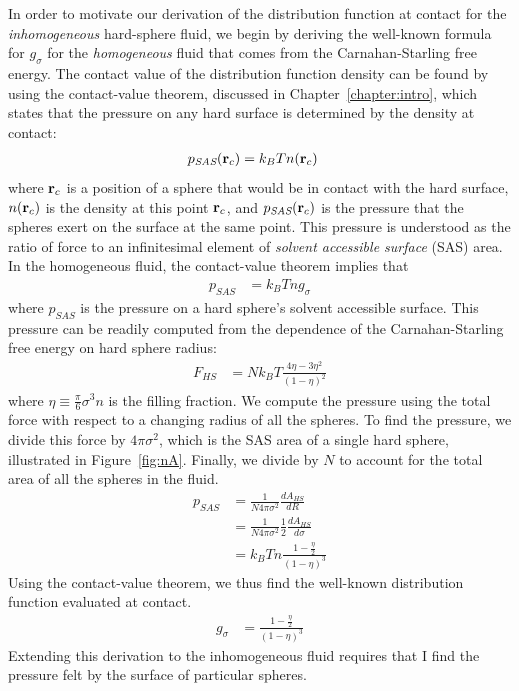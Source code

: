 In order to motivate our derivation of the distribution function at
contact for the \emph{inhomogeneous} hard-sphere fluid, we begin by
deriving the well-known formula for $g_\sigma$ for the
\emph{homogeneous} fluid that comes from the Carnahan-Starling free
energy.  The contact value of the distribution function density can be
found by using the contact-value theorem, discussed in
Chapter~\ref{chapter:intro}, which states that the pressure on any
hard surface is determined by the density at contact:
\begin{align}
  p_{\textit{SAS}}(\textbf{r}_c) &= k_BT n(\textbf{r}_c)
\end{align}
where $\textbf{r}_c$ is a position of a sphere that would be in contact with
the hard surface, $n(\textbf{r}_c)$ is the density at this point $\textbf{r}_c$, and
$p_{\textit{SAS}}(\textbf{r}_c)$ is the pressure that the spheres
exert on the surface at the same point.  This pressure is
understood as the ratio of force to an infinitesimal element of
\emph{solvent accessible surface} (SAS) area.
%
In the homogeneous fluid, the contact-value theorem implies that
\begin{align}
  p_{\textit{SAS}} &= k_BT n g_\sigma
\end{align}
where $p_{SAS}$ is the pressure on a hard sphere's solvent accessible surface.
This pressure can be
readily computed from the dependence of the Carnahan-Starling free
energy on hard sphere radius:
\begin{align}
  F_{HS} &= Nk_BT \frac{4\eta - 3\eta^2}{(1-\eta)^2}
\end{align}
where $\eta \equiv \frac{\pi}{6} \sigma^3 n$ is the filling fraction.
We compute the pressure using the total force with
respect to a changing radius of all the spheres.
To find the pressure, we divide this force by $4\pi \sigma^2$, which
is the SAS area of a single hard sphere, illustrated in Figure~\ref{fig:nA}.
Finally, we divide by $N$ to account for the total area of all the
spheres in the fluid.
\begin{align}
  p_{\textit{SAS}} &= \frac{1}{N 4\pi \sigma^2} \frac{dA_{HS}}{dR} \\
  &= \frac{1}{N 4\pi \sigma^2} \frac12 \frac{dA_{HS}}{d\sigma} \\
  &= k_BT n \frac{1 - \frac{\eta}2}{(1-\eta)^3}
\end{align}
Using the contact-value theorem, we thus find the well-known
distribution function evaluated at contact.
\begin{align}
  g_\sigma &= \frac{1 - \frac{\eta}2}{(1-\eta)^3} \label{eq:cs-g}
\end{align}
Extending this derivation to the inhomogeneous fluid requires that I
find the pressure felt by the surface of particular spheres.


